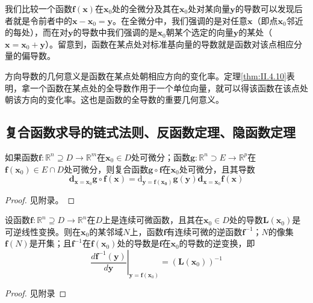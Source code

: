 \documentclass[main.tex]{subfiles}
\begin{document}
我们比较一个函数$\mathbf{f}\left(\mathbf{x}\right)$在$\mathbf{x}_0$处的全微分及其在$\mathbf{x}_0$处对某向量$\mathbf{y}$的导数可以发现后者就是令前者中的$\mathbf{x}-\mathbf{x}_0=\mathbf{y}$。在全微分中，我们强调的是对任意$\mathbf{x}$（即点$\mathbf{x}_0$邻近的每处），而在对$\mathbf{y}$的导数中我们强调的是$\mathbf{x}_0$朝某个选定的向量$\mathbf{y}$的某处（$\mathbf{x}=\mathbf{x}_0+\mathbf{y}$）。留意到，函数在某点处对标准基向量的导数就是函数对该点相应分量的偏导数。

方向导数的几何意义是函数在某点处朝相应方向的变化率。定理\ref{thm:II.4.10}表明，拿一个函数在某点处的全导数作用于一个单位向量，就可以得该函数在该点处朝该方向的变化率。这也是函数的全导数的重要几何意义。
\subsection{复合函数求导的链式法则、反函数定理、隐函数定理}
\begin{theorem}[复合函数求导的链式法则]\label{thm:II.4.11}
    如果函数$\mathbf{f}:\mathbb{R}^n\supseteq D\rightarrow\mathbb{R}^m$在$\mathbf{x}_0\in D$处可微分；函数$\mathbf{g}:\mathbb{R}^n\supset E\rightarrow\mathbb{R}^p$在$\mathbf{f}\left(\mathbf{x}_0\right)\in E\cap D$处可微分，则复合函数$\mathbf{g}\circ\mathbf{f}$在$\mathbf{x}_0$处可微分，且其导数
    \[\mathbf{d}_{\mathbf{x}=\mathbf{x}_0}\mathbf{g}\circ\mathbf{f}\left(\mathbf{x}\right)=\mathrm{d}_{\mathbf{y=\mathbf{f}\left(\mathbf{x}_0\right)}}\mathbf{g}\left(\mathbf{y}\right)\mathbf{d}_{\mathbf{x}=\mathbf{x}_0}\mathbf{f}\left(\mathbf{x}\right)\]
\end{theorem}
\begin{proof}
    见附录。
\end{proof}

\begin{theorem}[反函数定理]\label{thm:II.4.12}
    设函数$\mathbf{f}:\mathbb{R}^n\supseteq D\rightarrow\mathbb{R}^n$在$D$上是连续可微函数，且其在$\mathbf{x}_0\in D$处的导数$\mathbf{L}\left(\mathbf{x}_0\right)$是可逆线性变换。则在$\mathbf{x}_0$的某邻域$N$上，函数$\mathbf{f}$有连续可微的逆函数$\mathbf{f}^{-1}$；$N$的像集$\mathbf{f}\left(N\right)$是开集；且$\mathbf{f}^{-1}$在$\mathbf{f}\left(\mathbf{x}_0\right)$处的导数是$\mathbf{f}$在$\mathbf{x}_0$的导数的逆变换，即
    \[\left.\frac{d\mathbf{f}^{-1}\left(\mathbf{y}\right)}{d\mathbf{y}}\right|_{\mathbf{y}=\mathbf{f}\left(\mathbf{x}_0\right)}=\left(\mathbf{L}\left(\mathbf{x}_0\right)\right)^{-1}\]
\end{theorem}
\begin{proof}
    见附录
\end{proof}
\end{document}
